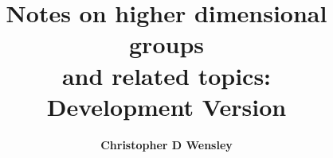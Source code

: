 \documentclass[11pt,a4paper]{article}
\begin{document}
  \title
  {\bf Notes on higher dimensional groups\\
       and related topics:\\
       Development Version}
    \author{{\bf Christopher D Wensley}}
  \maketitle

\tableofcontents

\newpage 

\newpage 

\newpage 

\newpage 

\newpage 

\newpage 

\newpage 

\newpage 


\newpage  


\newpage  
 

\newpage 

\newpage  

\newpage 

\newpage  
 

\newpage 

\newpage 

\newpage 

\newpage 

\newpage 



\printindex
\end{document}
